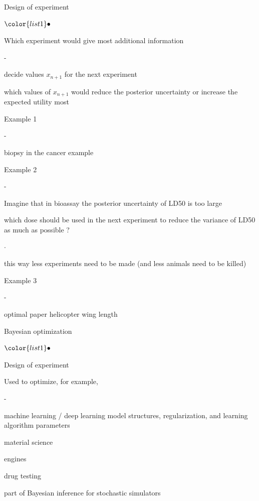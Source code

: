 \documentclass[t]{beamer}
\newenvironment{list1}{
   \begin{list}{$\color{list1}\bullet$}{\itemsep=6pt}}{
  \end{list}}
\newenvironment{list2}{
  \begin{list}{-}{\baselineskip=12pt\itemsep=2pt}}{
  \end{list}}
\newenvironment{list3}{
  \begin{list}{$\cdot$}{\baselineskip=15pt}}{
  \end{list}}
\begin{document}
\begin{frame}{Design of experiment}

  \begin{list1}
  \item Which experiment would give most additional information
    \begin{list2}
    \item decide values $x_{n+1}$ for the next experiment
    \item which values of $x_{n+1}$ would reduce the posterior
      uncertainty or increase the expected utility most
    \end{list2}
  \item<2-> Example 1
    \begin{list2}
      \item biopsy in the cancer example
    \end{list2}
  \item<3-> Example 2
    \begin{list2}
    \item Imagine that in bioassay the posterior uncertainty of LD50 is too large
    \item which dose should be used in the next experiment to reduce
      the variance of LD50 as much as possible ?
      \begin{list3}
        \item this way less experiments need to be made (and less animals need to be killed)
      \end{list3}
    \end{list2}
  \item<4-> Example 3
    \begin{list2}
      \item optimal paper helicopter wing length
    \end{list2}
  \end{list1}
\end{frame}

\begin{frame}{Bayesian optimization}

  \begin{list1}
  \item Design of experiment
  \item Used to optimize, for example,
    \begin{list2}
    \item machine learning / deep learning model structures,
      regularization, and learning algorithm parameters
    \item material science
    \item engines
    \item drug testing
    \item part of Bayesian inference for stochastic simulators
    \end{list2}
  \end{list1}

\end{frame}
\end{document}
